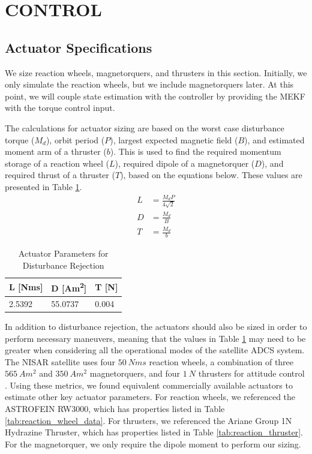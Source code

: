 \section{\Large CONTROL}
\subsection{Actuator Specifications}
We size reaction wheels, magnetorquers, and thrusters in this section. Initially, we only simulate the reaction wheels, but we include magnetorquers later. At this point, we will couple state estimation with the controller by providing the MEKF with the torque control input.

The calculations for actuator sizing are based on the worst case disturbance torque ($M_d$), orbit period ($P$), largest expected magnetic field ($B$), and estimated moment arm of a thruster ($b$). This is used to find the required momentum storage of a reaction wheel ($L$), required dipole of a magnetorquer ($D$), and required thrust of a thruster ($T$), based on the equations below. These values are presented in Table \ref{tab:estimate_actuator_sizing}.
\begin{align*}
    L &= \frac{M_d P}{4 \sqrt{2}} \\
    D &= \frac{M_d}{B} \\
    T &= \frac{M_d}{b}
\end{align*}
\begin{table}[H]
\centering
\caption{Actuator Parameters for Disturbance Rejection}
\label{tab:estimate_actuator_sizing}
\begin{tabular}{|l|l|l|}
\hline
L [Nms] & D [A\/m\textsuperscript{2}] & T [N]    \\ \hline
2.5392    & 55.0737   & 0.004        \\ \hline
\end{tabular}
\end{table}

In addition to disturbance rejection, the actuators should also be sized in order to perform necessary maneuvers, meaning that the values in Table \ref{tab:estimate_actuator_sizing} may need to be greater when considering all the operational modes of the satellite ADCS system. The NISAR satellite uses four $\qty{50}{Nms}$ reaction wheels, a combination of three $\qty{565}{Am^2}$ and $\qty{350}{Am^2}$ magnetorquers, and four $\qty{1}{N}$ thrusters for attitude control \cite{NISARMission}. Using these metrics, we found equivalent commercially available actuators to estimate other key actuator parameters. For reaction wheels, we referenced the ASTROFEIN RW3000, which has properties listed in Table \ref{tab:reaction_wheel_data}. For thrusters, we referenced the Ariane Group 1N Hydrazine Thruster, which has properties listed in Table \ref{tab:reaction_thruster}. For the magnetorquer, we only require the dipole moment to perform our sizing.

